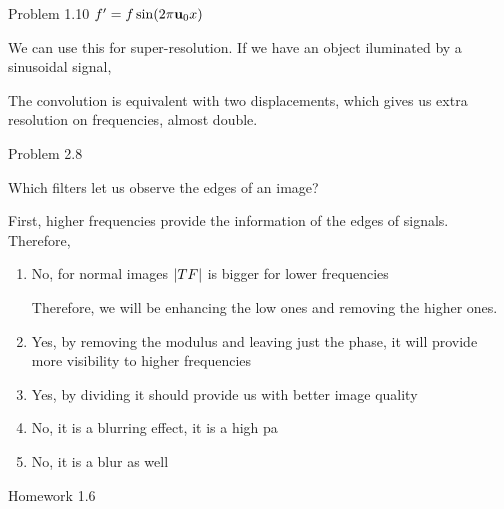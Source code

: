 \documentclass[../main/main.tex]{subfiles}
\begin{document}
Problem 1.10 $f' = f \sin(2 \pi \vb{u}_0 x)$

We can use this for super-resolution. If we have an object iluminated by a sinusoidal signal,

The convolution is equivalent with two displacements, which gives us extra resolution on frequencies, almost double.



Problem 2.8

Which filters let us observe the edges of an image?

First, higher frequencies provide the information of the edges of signals. Therefore,

\begin{enumerate}
	\item No, for normal images $\abs{TF}$ is bigger for lower frequencies

	Therefore, we will be enhancing the low  ones and removing the higher ones.


	\item Yes, by removing the modulus and leaving just the phase, it will provide more visibility to higher frequencies
	\item Yes, by dividing it should provide us with better image quality
	\item No, it is a blurring effect, it is a high pa
	\item No, it is a blur as well
\end{enumerate}


Homework 1.6
\end{document}
